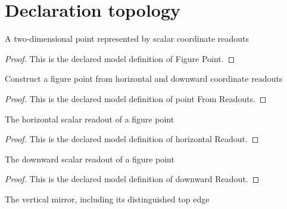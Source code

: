 \section{Declaration topology}
\begin{definition}
  \label{def:physics:phyx-mini-0061:phyxminiproblems-problemphyxmini0061-figurepoint}
  A two-dimensional point represented by scalar coordinate readouts
\end{definition}
\begin{proof}
  This is the declared model definition of Figure Point.
\end{proof}
\begin{definition}
  \label{def:physics:phyx-mini-0061:phyxminiproblems-problemphyxmini0061-pointfromreadouts}
  Construct a figure point from horizontal and downward coordinate readouts
\end{definition}
\begin{proof}
  This is the declared model definition of point From Readouts.
\end{proof}
\begin{definition}
  \label{def:physics:phyx-mini-0061:phyxminiproblems-problemphyxmini0061-horizontalreadout}
  The horizontal scalar readout of a figure point
\end{definition}
\begin{proof}
  This is the declared model definition of horizontal Readout.
\end{proof}
\begin{definition}
  \label{def:physics:phyx-mini-0061:phyxminiproblems-problemphyxmini0061-downwardreadout}
  The downward scalar readout of a figure point
\end{definition}
\begin{proof}
  This is the declared model definition of downward Readout.
\end{proof}
\begin{definition}
  \label{def:physics:phyx-mini-0061:phyxminiproblems-problemphyxmini0061-verticalmirror}
  The vertical mirror, including its distinguished top edge
\end{definition}
